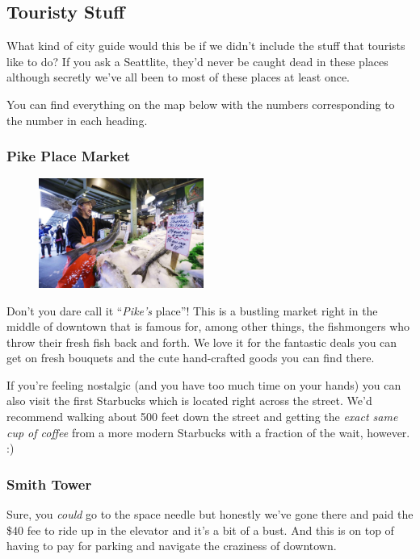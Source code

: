 \documentclass[10pt]{article}
\begin{document}
\subsection{Touristy Stuff}
What kind of city guide would this be if we didn't include the stuff that tourists like 
to do? If you ask a Seattlite, they'd never be caught dead in these places although secretly
we've all been to most of these places at least once.

You can find everything on the map below with the numbers corresponding to the number in each heading.

\subsubsection{Pike Place Market}
\begin{figure}
    \centering
    \includegraphics[width=0.48\textwidth]{fish.jpg}
\end{figure}
Don't you dare call it ``\textit{Pike's} place''! This is a bustling market right in the middle
of downtown that is famous for, among other things, the fishmongers who throw their fresh
fish back and forth. We love it for the fantastic deals you can get on fresh bouquets and the
cute hand-crafted goods you can find there.

If you're feeling nostalgic (and you have too much time on your hands) you can also visit the first Starbucks
which is located right across the street. We'd recommend walking about 500 feet down the street
and getting the \textit{exact same cup of coffee} from a more modern Starbucks with a fraction of the wait, however. :)

\subsubsection{Smith Tower}
Sure, you \textit{could} go to the space needle but honestly we've gone there and paid the \$40 fee to ride up in
the elevator and it's a bit of a bust. And this is on top of having to pay for parking and navigate the craziness
of downtown.
\end{document}
